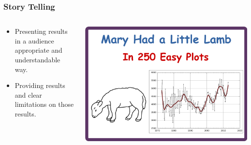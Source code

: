 \begin{frame}
\frametitle{Story Telling}

\begin{center}


\begin{columns}

\begin{column}{0.5\textwidth}
\begin{center}
\begin{itemize}
\item Presenting results in a audience appropriate and understandable way.
\item Providing results and clear limitations on those results.
\end{itemize}
\end{center}
\end{column}

\begin{column}{0.5\textwidth}
\includegraphics[width=1.0\textwidth]{graphics/mary_had.pdf}
\end{column}

\end{columns}

\end{center}

\end{frame}

